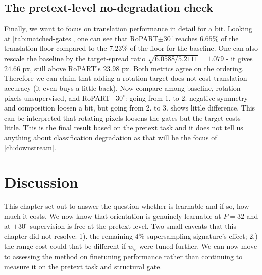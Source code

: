 \documentclass[final_report.tex]{subfiles}
\begin{document}
\subsection{The pretext-level no-degradation check}\label{sec:no-degradation-pretext}
Finally, we want to focus on translation performance in detail for a bit. Looking at \cref{tab:matched-gates}, one can see that RoPART$\pm30^\circ$ reaches $6.65\%$ of the translation floor compared to the $7.23\%$ of the floor for the baseline. One can also rescale the baseline by the target-spread ratio $\sqrt{6.0588/5.2111} = 1.079$ - it gives $24.66$ px, still above RoPART's $23.98$ px. Both metrics agree on the ordering. Therefore we can claim that adding a rotation target does not cost translation accuracy (it even buys a little back). Now compare among baseline, rotation-pixels-unsupervised, and RoPART$\pm30^\circ$: going from 1. to 2. negative symmetry and composition loosen a bit, but going from 2. to 3. shows little difference. This can be interpreted that rotating pixels loosens the gates but the target costs little. This is the final result based on the pretext task and it does not tell us anything about classification degradation as that will be the focus of \cref{ch:downstream}.

\section{Discussion}\label{sec:pretraining-discussion}
This chapter set out to answer the question whether \dphi{} is learnable and if so, how much it costs. We now know that orientation is genuinely learnable at $P=32$ and at $\pm30^\circ$ supervision is free at the pretext level. Two small caveats that this chapter did not resolve: 1). the remaining $4\%$ supersampling signature's effect; 2.) the range cost could that be different if $w_\varphi$ were tuned further. We can now move to assessing the method on finetuning performance rather than continuing to measure it on the pretext task and structural gate.




\ifSubfilesClassLoaded{\pagebreak\printbibliography}{}
\end{document}
